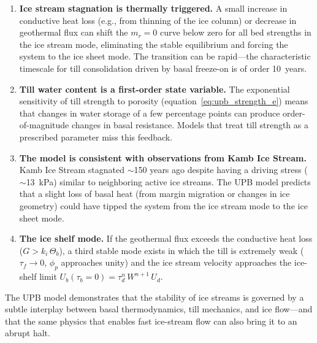 \documentclass[11pt]{article}
\begin{document}
\begin{enumerate}
  \item \textbf{Ice stream stagnation is thermally triggered.}  A small increase in conductive heat loss (e.g., from thinning of the ice column) or decrease in geothermal flux can shift the $m_r = 0$ curve below zero for all bed strengths in the ice stream mode, eliminating the stable equilibrium and forcing the system to the ice sheet mode.  The transition can be rapid---the characteristic timescale for till consolidation driven by basal freeze-on is of order 10~years.

  \item \textbf{Till water content is a first-order state variable.}  The exponential sensitivity of till strength to porosity (equation~\ref{eq:upb_strength_e}) means that changes in water storage of a few percentage points can produce order-of-magnitude changes in basal resistance.  Models that treat till strength as a prescribed parameter miss this feedback.

  \item \textbf{The model is consistent with observations from Kamb Ice Stream.}  Kamb Ice Stream stagnated $\sim$150 years ago despite having a driving stress ($\sim$13~kPa) similar to neighboring active ice streams.  The UPB model predicts that a slight loss of basal heat (from margin migration or changes in ice geometry) could have tipped the system from the ice stream mode to the ice sheet mode.

  \item \textbf{The ice shelf mode.}  If the geothermal flux exceeds the conductive heat loss ($G > k_i\,\Theta_b$), a third stable mode exists in which the till is extremely weak ($\tau_f \to 0$, $\phi_p$ approaches unity) and the ice stream velocity approaches the ice-shelf limit $U_b(\tau_b = 0) = \tau_d^n\,W^{n+1}\,U_d$.
\end{enumerate}

\noindent The UPB model demonstrates that the stability of ice streams is governed by a subtle interplay between basal thermodynamics, till mechanics, and ice flow---and that the same physics that enables fast ice-stream flow can also bring it to an abrupt halt.



\end{document}

